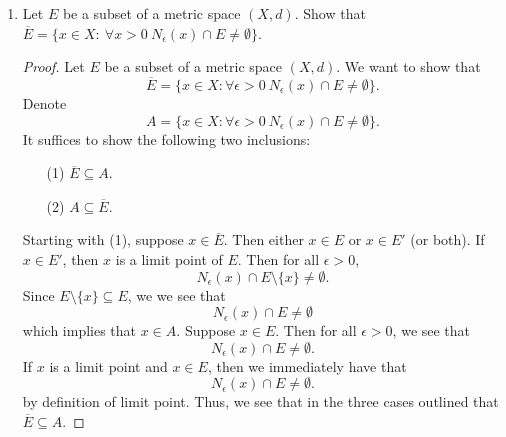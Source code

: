 \documentclass[a4paper]{article}
\begin{document}
\begin{enumerate}
\begin{proof}
\begin{enumerate}
               \[  \Big(  \bigcap_{ \alpha }^{  } {F}_{\alpha} \Big)^{c} \ \text{is open} \Longleftrightarrow \bigcap_{ \alpha }^{  }  {F}_{\alpha} \ \text{is closed}  \]
               and we are done.
            \item[(2)] Let \( \{ {F}_{i} : 1 \leq i \leq n  \}  \) be a finite collection of closed sets \( {F}_{i} \). We want to show that \( \bigcup_{ i=1 }^{ n } {F}_{i} \) is a closed set. It suffices to show that the complement of this set, that is \( \Big(  \bigcup_{ i=1 }^{ n } {F}_{i} \Big)^{c} \) is open. Observe that
                \[ \Big(  \bigcup_{ i=1 }^{ n } {F}_{i} \Big)^{c} = \bigcap_{ i=1 }^{ n } {F}_{i}^{c}.  \]
                Note that each \( {F}_{i}^{c} \) is open if and only if each \( {F}_{i} \) is closed. Thus, the finite intersection of each open set \( {F}_{i}^{c}  \) is open; that is,
                \[ \Big(  \bigcup_{ i=1 }^{ n } {F}_{i} \Big)^{c} = \bigcap_{ i=1 }^{ n } {F}_{i}^{c} \ \text{is open}.  \]
                Hence, the finite union of closed sets
                \[  \bigcup_{ i=1 }^{ n } {F}_{i} \ \text{is closed}. \]
        \end{enumerate}
        \end{proof}
    \item Let \( E  \) be a subset of a metric space \( (X,d ) \). Show that \( \overline{E} = \{ x \in X : \ \forall x > 0 \ {N}_{\epsilon}(x) \cap E \neq \emptyset \}  \).
    \begin{proof}
        Let \( E  \) be a subset of a metric space \( (X,d) \). We want to show that 
        \[ \overline{E} =\{  x \in X : \forall   \epsilon > 0 \ {N}_{\epsilon}(x) \cap E \neq \emptyset \}.  \] 
        Denote 
        \[  A = \{  x \in X : \forall  \epsilon > 0 \ {N}_{\epsilon}(x) \cap E \neq \emptyset \}.   \]
        It suffices to show the following two inclusions:
        \begin{enumerate}
            \item[(1)] \( \overline{E} \subseteq A \).
            \item[(2)] \( A \subseteq \overline{E} \).
        \end{enumerate}
        Starting with (1), suppose \( x \in \overline{E} \). Then either \( x \in E  \) or \( x \in E' \) (or both). If \( x \in E'  \), then \( x  \) is a limit point of \( E  \). Then for all \( \epsilon > 0  \),
        \[  {N}_{\epsilon}(x) \cap E \setminus  \{ x \}  \neq \emptyset. \]
        Since \( E \setminus  \{ x \} \subseteq E  \), we we see that 
        \[  {N}_{\epsilon}(x) \cap E \neq \emptyset \]
        which implies that \( x \in A \). Suppose \( x \in E  \). Then for all \( \epsilon > 0 \), we see that  
        \[  {N}_{\epsilon}(x) \cap E \neq \emptyset. \]
        If \( x  \) is a limit point and \( x \in E  \), then we immediately have that 
        \[  {N}_{\epsilon}(x) \cap E \neq \emptyset.  \]
        by definition of limit point. Thus, we see that in the three cases outlined that \( \overline{E} \subseteq A  \).
       

\end{proof}
\end{enumerate}
\end{document}
